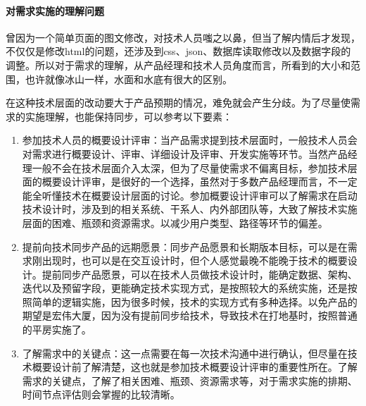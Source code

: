 \documentclass[letterpaper,10pt,english]{sphinxmanual}
\begin{document}
\paragraph{对需求实施的理解问题}
\label{\detokenize{chapter_idea/understand_tech:id11}}
曾因为一个简单页面的图文修改，对技术人员嗤之以鼻，但当了解内情后才发现，不仅仅是修改html的问题，还涉及到css、json、数据库读取修改以及数据字段的调整。所以对于需求的理解，从产品经理和技术人员角度而言，所看到的大小和范围，也许就像冰山一样，水面和水底有很大的区别。

在这种技术层面的改动要大于产品预期的情况，难免就会产生分歧。为了尽量使需求的实施理解，也能保持同步，可以参考以下要素：
\begin{enumerate}
%
\item {} 
参加技术人员的概要设计评审：当产品需求提到技术层面时，一般技术人员会对需求进行概要设计、评审、详细设计及评审、开发实施等环节。当然产品经理一般不会在技术层面介入太深，但为了尽量使需求不偏离目标，参加技术层面的概要设计评审，是很好的一个选择，虽然对于多数产品经理而言，不一定能全听懂技术在概要设计层面的讨论。参加概要设计评审可以了解需求在启动技术设计时，涉及到的相关系统、干系人、内外部团队等，大致了解技术实施层面的困难、瓶颈和资源需求。以减少用户类型、路径等环节的偏差。

\item {} 
提前向技术同步产品的远期愿景：同步产品愿景和长期版本目标，可以是在需求刚出现时，也可以是在交互设计时，但个人感觉最晚不能晚于技术的概要设计。提前同步产品愿景，可以在技术人员做技术设计时，能确定数据、架构、迭代以及预留字段，更能确定技术实现方式，是按照较大的系统实施，还是按照简单的逻辑实施，因为很多时候，技术的实现方式有多种选择。以免产品的期望是宏伟大厦，因为没有提前同步给技术，导致技术在打地基时，按照普通的平房实施了。

\item {} 
了解需求中的关键点：这一点需要在每一次技术沟通中进行确认，但尽量在技术概要设计前了解清楚，这也就是参加技术概要设计评审的重要性所在。了解需求的关键点，了解了相关困难、瓶颈、资源需求等，对于需求实施的排期、时间节点评估则会掌握的比较清晰。

\end{enumerate}
\end{document}
